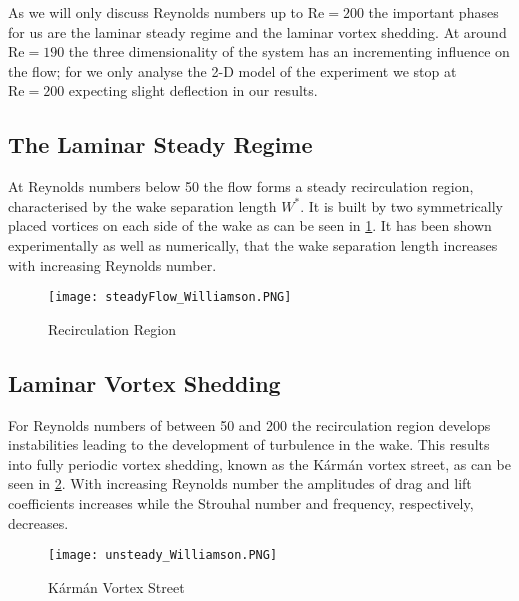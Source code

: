 	As we will only discuss Reynolds numbers up to $\text{Re} = 200$ the important phases for us are the laminar steady regime and the laminar vortex shedding. At around $\text{Re} = 190$ the three dimensionality of the system has an incrementing influence on the flow; for we only analyse the 2-D model of the experiment we stop at $\text{Re} = 200$ expecting slight deflection in our results.
	
	\subsection{The Laminar Steady Regime}
	
	At Reynolds numbers below 50 the flow forms a steady recirculation region, characterised by the wake separation length  $W^*$. It is built by two symmetrically placed vortices on each side of the wake as can be seen in \cref{fig:steady}. It has been shown experimentally as well as numerically, that the wake separation length increases with increasing Reynolds number. 
		\begin{figure}[htp]
			\centering
			\texttt{[image: steadyFlow\_Williamson.PNG]}
			\caption{Recirculation Region \cite{williamson1996vortex}}
			\label{fig:steady}
		\end{figure}
	\subsection{Laminar Vortex Shedding}
	For Reynolds numbers of between 50 and 200 the recirculation region develops instabilities leading to the development of turbulence in the wake. This results into fully periodic vortex shedding, known as the Kármán vortex street, as can be seen in \cref{fig:unsteady}. With increasing Reynolds number the amplitudes of drag and lift coefficients increases while the Strouhal number and frequency, respectively, decreases.
	
		\begin{figure}[htp]
			\centering
			\texttt{[image: unsteady\_Williamson.PNG]}
			\caption{Kármán Vortex Street \cite{williamson1996vortex}}
			\label{fig:unsteady}
		\end{figure}
		
